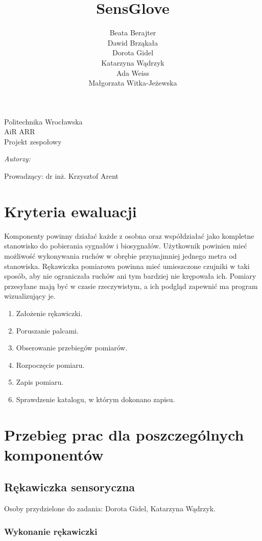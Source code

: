 \documentclass{article}
\author{Beata Berajter\\
Dawid Brząkała\\
Dorota Gidel\\
Katarzyna Wądrzyk\\
Ada Weiss\\
Małgorzata Witka-Jeżewska\\
 }
\title{SensGlove}
\makeatletter
\renewcommand{\maketitle}{\begin{titlepage}
    \vspace*{1cm}
    \begin{center}
    Politechnika Wrocławska\\
    AiR ARR\\
 Projekt zespołowy
    \end{center}
      \vspace{3cm}
    \begin{center}

     \LARGE \textsc {\@title}
         \end{center}
     \vspace{1cm}

    \begin{center}
    \textit{ Autorzy:}\\
   \textit{\@author}
     \end{center}
      \vspace{1cm}

     \begin{center}

    Prowadzący:
  dr inż. Krzysztof Arent
    \end{center}

    \vspace*{\stretch{6}}
    \begin{center}
    \@date
    \end{center}
  \end{titlepage}
}
\makeatother
\begin{document}
\maketitle
\newpage
\tableofcontents
\newpage



\section{Kryteria ewaluacji}
Komponenty powinny działać każde z osobna oraz współdziałać jako kompletne stanowisko do pobierania sygnałów i biosygnałów. Użytkownik powinien mieć możliwość wykonywania ruchów w obrębie przynajmniej jednego metra od stanowiska. Rękawiczka pomiarowa powinna mieć umieszczone czujniki w taki sposób, aby nie ograniczała ruchów ani tym bardziej nie krępowała ich. Pomiary przesyłane mają być w czasie rzeczywistym, a ich podgląd zapewnić ma program wizualizujący je.
\begin{enumerate}
	\item Założenie rękawiczki.
	\item Poruszanie palcami.
	\item Obserowanie przebiegów pomiarów.
	\item Rozpoczęcie pomiaru.
	\item Zapis pomiaru.
	\item Sprawdzenie katalogu, w którym dokonano zapisu.
\end{enumerate}
%
%
%
%
%
\section{Przebieg prac dla poszczególnych komponentów}
\subsection{Rękawiczka sensoryczna}
Osoby przydzielone do zadania: Dorota Gidel, Katarzyna Wądrzyk.
\subsubsection{Wykonanie rękawiczki}
\end{document}
